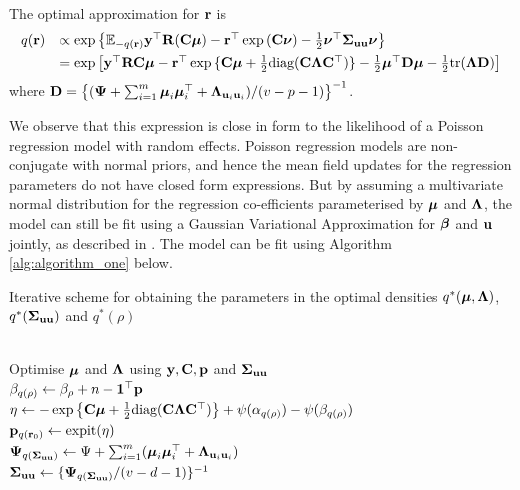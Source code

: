 
The optimal approximation  for
${\bf r}$ is
\[
\begin{array}{rl}
	q({\bf r}) & \propto \exp \left \{ {\mathbb E}_{-q({\bf r})}{\bf y}^\top{\bf R}({\bf C}{\boldsymbol \mu}) - {\bf r}^\top\exp{({\bf C}{\boldsymbol\nu})}-\frac{1}{2} {\boldsymbol \nu}^\top {\boldsymbol\Sigma}_{{\bf u} {\bf u}} {\boldsymbol \nu} \right \}                                                  \\ [1ex]
	       & = \exp{ \left[ {\bf y}^\top{\bf R}{\bf C}{\boldsymbol\mu}- {\bf r}^\top \exp{\{{\bf C}{\boldsymbol\mu}+ \frac{1}{2} \text{diag}({\bf C}{\boldsymbol\Lambda}{\bf C}^\top)\}} - \frac{1}{2} {\boldsymbol\mu}^\top {\bf D}{\boldsymbol\mu}- \frac{1}{2} \text{tr}({\boldsymbol\Lambda}{\bf D}) \right] } 
\end{array}
\]
\noindent where ${\bf D} = \left\{ ({\boldsymbol \Psi} + \sum_{i=1}^m {\boldsymbol \mu}_i {\boldsymbol \mu}_i^\top + {\boldsymbol \Lambda}_{{\bf u}_i{\bf u}_i}) / (v - p - 1) \right\}^{-1}$. 

We observe that this expression is close in form to the likelihood of a Poisson regression model with random
effects. Poisson regression models are non-conjugate with normal priors, and hence the mean field updates for
the regression parameters do not have closed form expressions. But by assuming a multivariate normal
distribution for the regression co-efficients parameterised by ${\boldsymbol \mu}$ and ${\boldsymbol \Lambda}$, the model can still be
fit using a Gaussian Variational Approximation for ${\boldsymbol \beta}$ and ${\bf u}$ jointly, as described in
\citep{Ormerod2012}. The model can be fit using Algorithm \ref{alg:algorithm_one} below.

\begin{algorithm}
	\caption[Algorithm 1]{Iterative scheme for obtaining the parameters in the
		optimal densities $q^*({\boldsymbol \mu}, {\boldsymbol \Lambda})$, $q^*({\boldsymbol \Sigma}_{{\bf u} {\bf u}})$ and $q^*(\rho)$}
	\label{alg:algorithm_one}
	\begin{algorithmic}
		 \\[1ex]
			\STATE Optimise ${\boldsymbol \mu}$ and ${\boldsymbol \Lambda}$ using ${\bf y}, {\bf C}, {\bf p}$ and ${\boldsymbol \Sigma}_{{\bf u} {\bf u}}$ \\[1ex]
			\STATE $\beta_{q(\rho)} \leftarrow \beta_\rho + n - {\bf 1}^\top{\bf p}$ \\[1ex]
			\STATE $\eta \leftarrow -\exp \left \{ {\bf C} {\boldsymbol \mu} + \frac{1}{2} \text{diag}{({\bf C}{\boldsymbol\Lambda}{\bf C}^\top)} \right \} + \psi{(\alpha_{q{(\rho)}})} - \psi{(\beta_{q{(\rho)}})}$ \\[1ex]
			\STATE ${\bf p}_{q({\bf r}_0)} \leftarrow \text{expit}{(\eta)}$ \\[1ex]
			\STATE ${\boldsymbol \Psi}_{q({\boldsymbol \Sigma}_{{\bf u} {\bf u}})} \leftarrow \Psi + \sum_{i=1}^m ({\boldsymbol \mu}_i {\boldsymbol \mu}_i^\top + {\boldsymbol \Lambda}_{{{\bf u}}_i {{\bf u}}_i})$ \\[1ex]
			\STATE ${\boldsymbol \Sigma}_{{\bf u}{\bf u}} \leftarrow \{{\boldsymbol \Psi}_{q({\boldsymbol \Sigma}_{{\bf u} {\bf u}})}/(v - d - 1)\}^{-1}$
		\ENDWHILE
	\end{algorithmic}
\end{algorithm}
						
